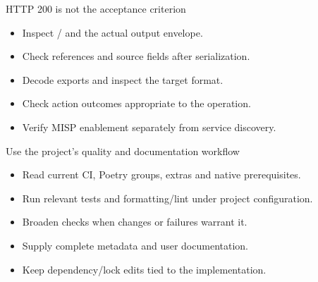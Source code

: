 \begin{frame}{HTTP 200 is not the acceptance criterion}
    \begin{itemize}
        \item Inspect / and the actual output envelope.
        \item Check references and source fields after serialization.
        \item Decode exports and inspect the target format.
        \item Check action outcomes appropriate to the operation.
        \item Verify MISP enablement separately from service discovery.
    \end{itemize}
\end{frame}

\begin{frame}{Use the project's quality and documentation workflow}
    \begin{itemize}
        \item Read current CI, Poetry groups, extras and native prerequisites.
        \item Run relevant tests and formatting/lint under project configuration.
        \item Broaden checks when changes or failures warrant it.
        \item Supply complete metadata and user documentation.
        \item Keep dependency/lock edits tied to the implementation.
    \end{itemize}
\end{frame}

